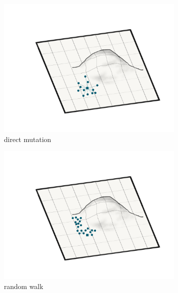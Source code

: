 \begin{figure}
 \centering
    \begin{subfigure}[b]{0.5\textwidth}
        \centering
    	\includegraphics[width=\textwidth]{img/static_mutation.png}
        \caption{direct mutation}
        \label{subfig:static_mutation}
    \end{subfigure}%
    \hfill
    \begin{subfigure}[b]{0.5\textwidth}
        \centering
        \includegraphics[width=\textwidth]{img/random_walk.png}
        \caption{random walk}
        \label{subfig:random_walk}
    \end{subfigure}
    \hfill
    \begin{subfigure}[b]{0.5\textwidth}

\end{subfigure}
\end{figure}

